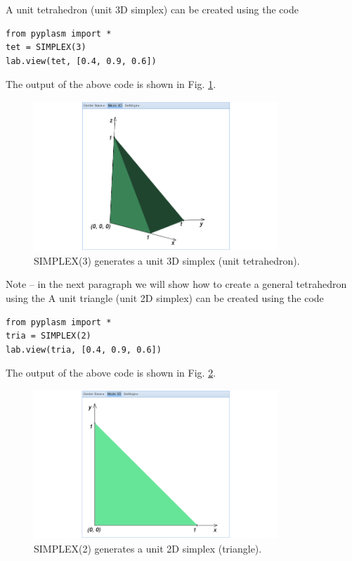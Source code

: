 \documentclass{article}
\begin{document}
A unit tetrahedron (unit 3D simplex) can be created using the code
\begin{verbatim}
from pyplasm import *
tet = SIMPLEX(3)
lab.view(tet, [0.4, 0.9, 0.6])
\end{verbatim}
The output of the above code is shown in Fig. \ref{fig:simplex-1}.

\begin{figure}[!ht]
\begin{center}
\includegraphics[width=0.82\textwidth]{img/simplex-1.png}
\end{center}
\vspace{-2mm}
\caption{SIMPLEX(3) generates a unit 3D simplex (unit tetrahedron).}
\label{fig:simplex-1}
\end{figure}
\noindent
Note -- in the next paragraph we will show how to create a general 
tetrahedron using the 
A unit triangle (unit 2D simplex) can be created using the code
\begin{verbatim}
from pyplasm import *
tria = SIMPLEX(2)
lab.view(tria, [0.4, 0.9, 0.6])
\end{verbatim}
The output of the above code is shown in Fig. \ref{fig:simplex-2}.
\newpage

\begin{figure}[!ht]
\begin{center}
\includegraphics[width=0.82\textwidth]{img/simplex-2.png}
\end{center}
\vspace{-2mm}
\caption{SIMPLEX(2) generates a unit 2D simplex (triangle).}
\label{fig:simplex-2}
\end{figure}
\end{document}
